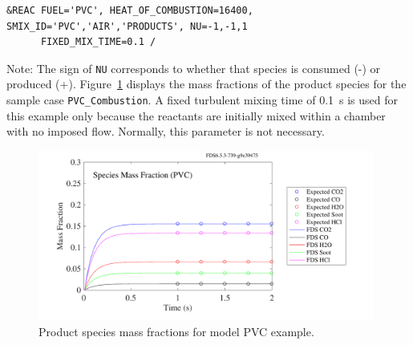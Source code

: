 \documentclass[11pt]{book}
\newcommand{\ct}{\tt\small}
\begin{document}
\footnotesize
\begin{verbatim}
&REAC FUEL='PVC', HEAT_OF_COMBUSTION=16400, SMIX_ID='PVC','AIR','PRODUCTS', NU=-1,-1,1
      FIXED_MIX_TIME=0.1 /
\end{verbatim} \normalsize

\noindent
Note: The sign of {\ct NU} corresponds to whether that species is consumed (-) or produced (+). Figure~\ref{pvc_combustion} displays the mass fractions of the product species for the sample case {\ct PVC\_Combustion}. A fixed turbulent mixing time of 0.1~s is used for this example only because the reactants are initially mixed within a chamber with no imposed flow. Normally, this parameter is not necessary.


\begin{figure}[ht]
\centering \includegraphics[height=2.2in]{SCRIPT_FIGURES/pvc_combustion_spec}
\caption[Results of the {\ct pvc\_combustion} test case]{Product species mass fractions for model PVC example.}
\label{pvc_combustion}
\end{figure}
\end{document}
